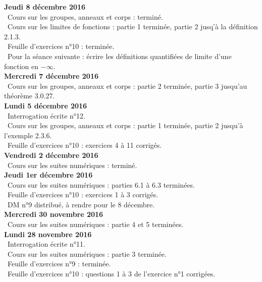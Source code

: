 \documentclass[12pt,a4paper]{article}
\begin{document}
\noindent\textbf{Jeudi 8 décembre 2016}\\
\bu\ Cours sur les groupes, anneaux et corps : terminé.\\
\bu\ Cours sur les limites de fonctions : partie 1 terminée, partie 2 jusq'à la définition 2.1.3.\\
\bu\ Feuille d'exercices n°10 : terminée.\\
\bu\ Pour la séance suivante : écrire les définitions quantifiées de limite d'une fonction en $-\infty$. \vspace{.4cm}\\

\noindent\textbf{Mercredi 7 décembre 2016}\\
\bu\ Cours sur les groupes, anneaux et corps :  partie 2 terminée, partie 3 jusqu'au théorème 3.0.27.\vspace{.4cm}\\

\noindent\textbf{Lundi 5 décembre 2016}\\
\bu\ Interrogation écrite n°12.\\
\bu\ Cours sur les groupes, anneaux et corps :  partie 1 terminée, partie 2 jusqu'à l'exemple 2.3.6.\\
\bu\ Feuille d'exercices n°10 : exercices 4 à 11 corrigés.\vspace{.4cm}\\

\noindent\textbf{Vendredi 2 décembre 2016}\\
\bu\ Cours sur les suites numériques : terminé.\vspace{.4cm}\\

\noindent\textbf{Jeudi 1er décembre 2016}\\
\bu\ Cours sur les suites numériques : parties 6.1 à 6.3 terminées. \\
\bu\ Feuille d'exercices n°10 : exercices 1 à 3 corrigés. \\
\bu\ DM n°9 distribué, à rendre pour le 8 décembre.\vspace{.4cm}\\

\noindent\textbf{Mercredi 30 novembre 2016}\\
\bu\ Cours sur les suites numériques : partie 4 et 5 terminées. \vspace{.4cm}\\

\noindent\textbf{Lundi 28 novembre 2016}\\
\bu\ Interrogation écrite n°11.\\
\bu\ Cours sur les suites numériques : partie 3 terminée.\\
\bu\ Feuille d'exercices n°9 : terminée.\\
\bu\ Feuille d'exercices n°10 : questions 1 à 3 de l'exercice n°1 corrigées. \vspace{.4cm}\\
\end{document}
